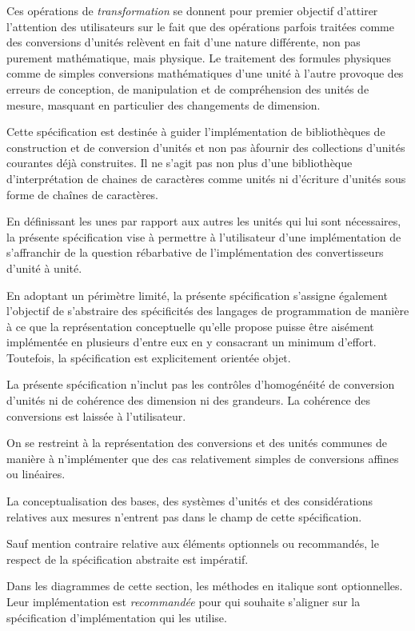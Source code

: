 \documentclass[a4paper,twoside,10pt]{article}
\begin{document}
Ces opérations de \emph{transformation} se donnent pour premier objectif d'attirer l'attention des utilisateurs sur
le fait que des opérations parfois traitées comme des conversions d'unités relèvent en fait d'une nature différente, non
pas purement mathématique, mais physique. Le traitement des formules physiques comme de simples conversions
mathématiques d'une unité à l'autre provoque des erreurs de conception, de manipulation et de compréhension des unités
de mesure, masquant en particulier des changements de dimension.

Cette spécification est destinée à guider l'implémentation de bibliothèques de construction et de conversion d'unités et
non pas àfournir des collections d'unités courantes déjà construites. Il ne s'agit pas non plus d'une bibliothèque
d'interprétation de chaines de caractères comme unités ni d'écriture d'unités sous forme de chaînes de caractères.

En définissant les unes par rapport aux autres les unités qui lui sont nécessaires, la présente spécification vise à
permettre à l'utilisateur d'une implémentation de s'affranchir de la question rébarbative de l'implémentation des
convertisseurs d'unité à unité.

En adoptant un périmètre limité, la présente spécification s'assigne également l'objectif de s'abstraire des
spécificités des langages de programmation de manière à ce que la représentation conceptuelle qu'elle propose puisse
être aisément implémentée en plusieurs d'entre eux en y consacrant un minimum d'effort. Toutefois, la spécification est
explicitement orientée objet.

La présente spécification n'inclut pas les contrôles d'homogénéité de conversion d'unités ni de cohérence des dimension
ni des grandeurs. La cohérence des conversions est laissée à l'utilisateur.

On se restreint à la représentation des conversions et des unités communes de manière à n'implémenter que des cas
relativement simples de conversions affines ou linéaires.

La conceptualisation des bases, des systèmes d'unités et des considérations relatives aux mesures n'entrent pas dans
le champ de cette spécification.

Sauf mention contraire relative aux éléments optionnels ou recommandés, le respect de la spécification abstraite est
impératif.

Dans les diagrammes de cette section, les méthodes en italique sont optionnelles. Leur implémentation est
\emph{recommandée} pour qui souhaite s'aligner sur la spécification d'implémentation qui les utilise.
\end{document}

